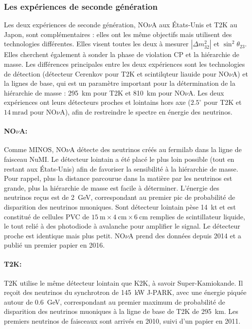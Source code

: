             \subsubsection{Les expériences de seconde génération}
            
            Les deux expériences de seconde génération, NO$\nu$A aux États-Unis et T2K au Japon, sont complémentaires : elles ont les même objectifs mais utilisent des technologies différentes.  Elles visent toutes les deux à mesurer $|\Delta m_{32}^2|$ et $\sin^2{\theta_{23}}$. Elles cherchent également à sonder la phase de violation CP et la hiérarchie de masse. Les différences principales entre les deux expériences sont les technologies de détection (détecteur Cerenkov pour T2K et scintilqteur liauide pour NO$\nu$A) et la lignes de base, qui est un paramètre important pour la détermination de la hiérarchie de masse : \SI{295}{\kilo\meter} pour T2K et \SI{810}{\kilo\meter} pour NO$\nu$A. Les deux expériences ont leurs détecteurs proches et lointains hors axe ($2.5^{\circ}$ pour T2K et $\SI{14}{\milli\radian}$ pour NO$\nu$A), afin de restreindre le spectre en énergie des neutrinos.
            
            \paragraph{NO$\nu$A\cite{Adamson2016}:} Comme MINOS, NO$\nu$A détecte des neutrinos créés au fermilab dans la ligne de faisceau NuMI. Le détecteur lointain a été placé le plus loin possible (tout en restant aux États-Unis) afin de favoriser la sensibilité à la hiérarchie de masse. Pour rappel, plus la distance parcourue dans la matière par les neutrinos est grande, plus la hiérarchie de masse est facile à déterminer. L'énergie des neutrinos reçus est de \SI{2}{\giga\electronvolt}, correspondant au premier pic de probabilité de disparition des neutrinos muoniques. Sont détecteur lointain pèse \SI{14}{\kilo\tonne} et est constitué de  cellules PVC de $\SI{15}{\meter}\times\SI{4}{\centi\meter}\times\SI{6}{\centi\meter}$ remplies de scintillateur liquide, le tout relié à des photodiode à avalanche pour amplifier le signal. Le détecteur proche est identique mais plus petit. NO$\nu$A prend des données depuis 2014 et a publié un premier papier en 2016\cite{Adamson2016}.
            
            \paragraph{T2K\cite{Abe2018}:} T2K utilise le même détecteur lointain que K2K, à savoir Super-Kamiokande. Il reçoit des neutrinos du synchrotron de \SI{145}{\kilo\watt} J-PARK, avec une énergie piquée autour de \SI{0.6}{\giga\electronvolt}, correspondant au premier maximum de probabilité de disparition des neutrinos muoniques à la ligne de base de T2K de \SI{295}{\kilo\meter}. Les premiers neutrinos de faisceaux sont arrivés en 2010, suivi d'un papier en 2011\cite{Abe2011}.
            
